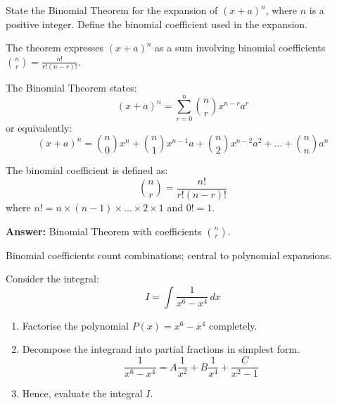 
\begin{problem}
State the Binomial Theorem for the expansion of $(x+a)^n$, where $n$ is a positive integer. Define the binomial coefficient used in the expansion.
\end{problem}

\vspace{0.5cm}
\begin{hintbox}
The theorem expresses $(x+a)^n$ as a sum involving binomial coefficients $\binom{n}{r} = \frac{n!}{r!(n-r)!}$.
\end{hintbox}

\begin{solution}
The Binomial Theorem states:
$$
(x+a)^n = \sum_{r=0}^{n} \binom{n}{r} x^{n-r} a^{r}
$$
or equivalently:
$$
(x+a)^n = \binom{n}{0} x^n + \binom{n}{1} x^{n-1} a + \binom{n}{2} x^{n-2} a^2 + \dots + \binom{n}{n} a^n
$$

The binomial coefficient is defined as:
$$
\binom{n}{r} = \frac{n!}{r!(n-r)!}
$$
where $n! = n \times (n-1) \times \dots \times 2 \times 1$ and $0! = 1$.

\textbf{Answer:} Binomial Theorem with coefficients $\binom{n}{r}$.
\end{solution}

\begin{takeaways}
Binomial coefficients count combinations; central to polynomial expansions.
\end{takeaways}

\vspace{1cm}

\begin{problem}
Consider the integral:
$$
I = \int \frac{1}{x^6 - x^4} \, dx
$$
\begin{enumerate}
    \item[(i)] Factorise the polynomial $P(x) = x^6 - x^4$ completely.
    \item[(ii)] Decompose the integrand into partial fractions in simplest form.
    $$
    \frac{1}{x^6 - x^4} = A \frac{1}{x^2} + B \frac{1}{x^4} + \frac{C}{x^2 - 1}
    $$
    \item[(iii)] Hence, evaluate the integral $I$.
\end{enumerate}
\end{problem}

